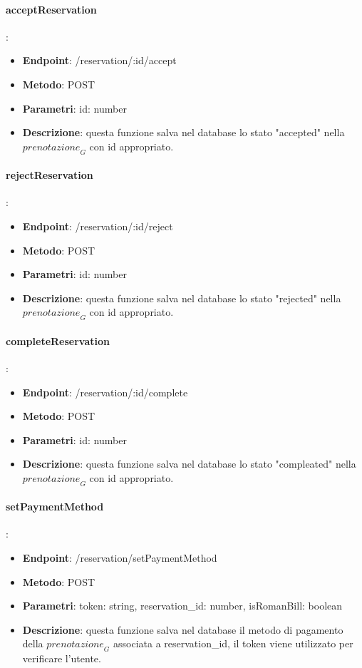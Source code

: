 \paragraph{acceptReservation}:
\begin{itemize}
    \item \textbf{Endpoint}: /reservation/:id/accept
    \item \textbf{Metodo}: POST
    \item \textbf{Parametri}: id: number
    \item \textbf{Descrizione}: questa funzione salva nel database lo stato "accepted" nella $\textit{prenotazione}_G$ con id appropriato.
\end{itemize}
\paragraph{rejectReservation}:
\begin{itemize}
    \item \textbf{Endpoint}: /reservation/:id/reject
    \item \textbf{Metodo}: POST
    \item \textbf{Parametri}: id: number
    \item \textbf{Descrizione}: questa funzione salva nel database lo stato "rejected" nella $\textit{prenotazione}_G$ con id appropriato.
\end{itemize}
\paragraph{completeReservation}:
\begin{itemize}
    \item \textbf{Endpoint}: /reservation/:id/complete
    \item \textbf{Metodo}: POST
    \item \textbf{Parametri}: id: number
    \item \textbf{Descrizione}: questa funzione salva nel database lo stato "compleated" nella $\textit{prenotazione}_G$ con id appropriato.
\end{itemize}
\paragraph{setPaymentMethod}:
\begin{itemize}
    \item \textbf{Endpoint}: /reservation/setPaymentMethod
    \item \textbf{Metodo}: POST
    \item \textbf{Parametri}: token: string, reservation\_id: number, isRomanBill: boolean 
    \item \textbf{Descrizione}: questa funzione salva nel database il metodo di pagamento della $\textit{prenotazione}_G$ associata a reservation\_id, il token viene utilizzato per verificare l'utente.
\end{itemize}

